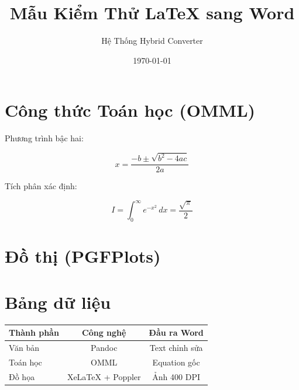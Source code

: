 \documentclass[12pt]{article}
\title{Mẫu Kiểm Thử LaTeX sang Word}
\author{Hệ Thống Hybrid Converter}
\date{\today}
\begin{document}
\maketitle



\section{Công thức Toán học (OMML)}

Phương trình bậc hai:

\[

x = \frac{-b \pm \sqrt{b^2 - 4ac}}{2a}

\]



Tích phân xác định:

\[

I = \int_{0}^{\infty} e^{-x^2}\,dx = \frac{\sqrt{\pi}}{2}

\]



\section{Đồ thị (PGFPlots)}

\begin{center}


\end{center}



\section{Bảng dữ liệu}

\begin{tabular}{lcc}

\toprule

Thành phần & Công nghệ & Đầu ra Word \\

\midrule

Văn bản & Pandoc & Text chỉnh sửa \\

Toán học & OMML & Equation gốc \\

Đồ họa & XeLaTeX + Poppler & Ảnh 400 DPI \\

\bottomrule

\end{tabular}
\end{document}
